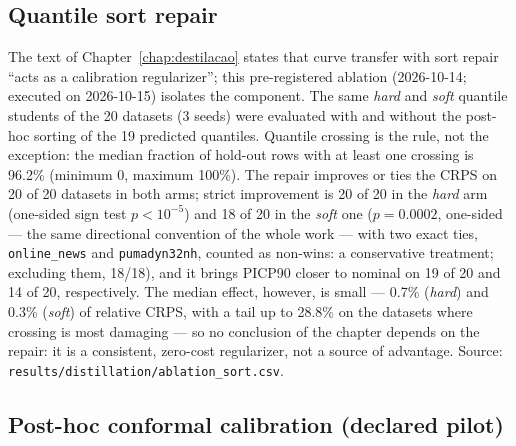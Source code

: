 \subsection{Quantile sort repair}
\label{sec:app-abl-sort}

The text of Chapter~\ref{chap:destilacao} states that curve transfer
with sort repair ``acts as a calibration regularizer''; this
pre-registered ablation (2026-10-14; executed on 2026-10-15) isolates the
component. The same \emph{hard} and \emph{soft} quantile students of
the 20 datasets (3 seeds) were evaluated with and without the
post-hoc sorting of the 19 predicted quantiles. Quantile crossing is
the rule, not the exception: the median fraction of hold-out rows
with at least one crossing is 96.2\% (minimum 0, maximum 100\%). The
repair improves or ties the CRPS on 20 of 20 datasets in both arms;
strict improvement is 20 of 20 in the \emph{hard} arm (one-sided
sign test $p<10^{-5}$) and 18 of 20 in the \emph{soft} one
($p=0.0002$, one-sided --- the same directional convention of the
whole work --- with two exact ties, \texttt{online\_news} and
\texttt{pumadyn32nh}, counted as non-wins: a conservative
treatment; excluding them, 18/18), and it brings PICP90 closer to
nominal on 19
of 20 and 14 of 20, respectively. The median effect, however, is
small --- 0.7\% (\emph{hard}) and 0.3\% (\emph{soft}) of relative
CRPS, with a tail up to 28.8\% on the datasets where crossing is
most damaging --- so no conclusion of the chapter depends on the
repair: it is a consistent, zero-cost regularizer, not a source of
advantage. Source:
\texttt{results/\allowbreak distillation/\allowbreak ablation\_\allowbreak sort.\allowbreak csv}.

\subsection{Post-hoc conformal calibration (declared pilot)}
\label{sec:app-pilot-conformal}


